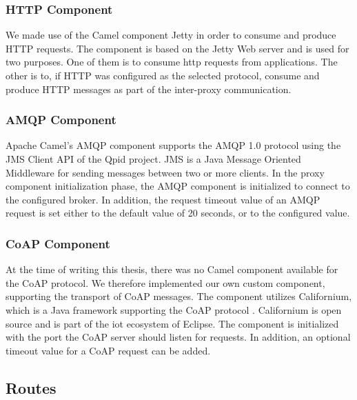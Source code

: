 \subsubsection{HTTP Component}

We made use of the Camel component Jetty in order to consume and produce HTTP
requests. The component is based on the Jetty Web server\cite{jetty-homepage}
and is used for two purposes. One of them is to consume \gls{http} requests from
applications. The other is to, if HTTP was configured as the selected protocol,
consume and produce HTTP messages as part of the inter-proxy communication.

\subsubsection{AMQP Component}

Apache Camel's AMQP component supports the AMQP 1.0 protocol using the JMS Client
API of the Qpid project. JMS is a Java Message Oriented Middleware for sending
messages between two or more clients. In the proxy component initialization
phase, the AMQP component is initialized to connect to the configured broker. In
addition, the request timeout value of an AMQP request is set either to the
default value of 20 seconds, or to the configured value.

\subsubsection{CoAP Component}

At the time of writing this thesis, there was no Camel component available for
the CoAP protocol. We therefore implemented our own custom component, supporting
the transport of CoAP messages. The component utilizes Californium, which is a
Java framework supporting the CoAP protocol \cite{californium-homepage}.
Californium is open source and is part of the \gls{iot} ecosystem of Eclipse.
The component is initialized with the port the CoAP server should listen for
requests. In addition, an optional timeout value for a CoAP request can be added.

\subsection{Routes}

